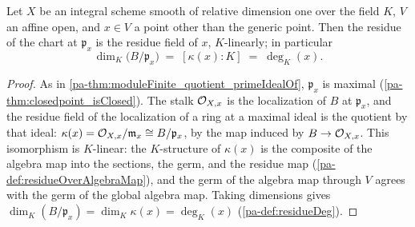 \begin{theorem}
  \label{pa-thm:finrank_quotient_primeIdealOf}
  \leanok

  Let \(X\) be an integral scheme smooth of relative dimension one over the field
  \(K\), \(V\) an affine open, and \(x \in V\) a point other than the generic point.
  Then the residue of the chart at \(\mathfrak p_x\) is the residue field of \(x\),
  \(K\)-linearly; in particular
  \[
    \dim_K\bigl(B/\mathfrak p_x\bigr) \;=\; [\kappa(x) : K] \;=\; \deg_K(x) .
  \]
\end{theorem}
\begin{proof}
  \leanok
  As in \ref{pa-thm:moduleFinite_quotient_primeIdealOf}, \(\mathfrak p_x\) is maximal
  (\ref{pa-thm:closedpoint_isClosed}). The stalk \(\mathcal{O}_{X,x}\) is the localization of
  \(B\) at \(\mathfrak p_x\), and the residue field of the localization of a ring at a
  maximal ideal is the quotient by that ideal: \(\kappa(x) =
  \mathcal{O}_{X,x}/\mathfrak m_x \cong B/\mathfrak p_x\), by the map induced by
  \(B \to \mathcal{O}_{X,x}\). This isomorphism is \(K\)-linear: the \(K\)-structure of
  \(\kappa(x)\) is the composite of the algebra map into the sections, the germ, and
  the residue map (\ref{pa-def:residueOverAlgebraMap}), and the germ of the algebra map
  through \(V\) agrees with the germ of the global algebra map. Taking dimensions
  gives \(\dim_K(B/\mathfrak p_x) = \dim_K \kappa(x) = \deg_K(x)\)
  (\ref{pa-def:residueDeg}).
\end{proof}

